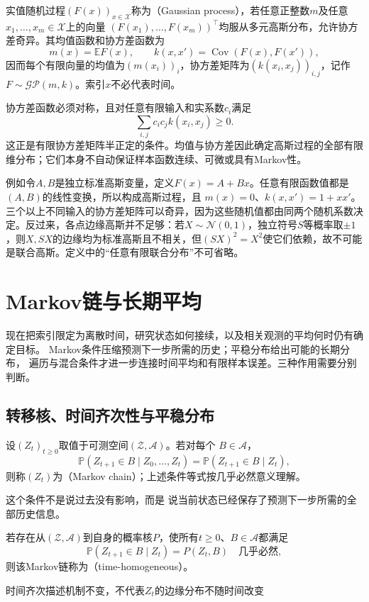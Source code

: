 \begin{definition}[高斯过程]
  \label{def:stoch-gaussian-process}
  实值随机过程\((F(x))_{x\in\mathcal X}\)称为（Gaussian process），若任意正整数\(m\)及任意\(x_1,\ldots,x_m\in\mathcal X\)上的向量
  \((F(x_1),\ldots,F(x_m))^\top\)均服从多元高斯分布，允许协方差奇异。其均值函数和协方差函数为
  \[
    m(x)=\mathbb E F(x),\qquad
    k(x,x')=\operatorname{Cov}(F(x),F(x')),
  \]
  因而每个有限向量的均值为\((m(x_i))_i\)，协方差矩阵为\((k(x_i,x_j))_{i,j}\)，记作\(F\sim\mathcal{GP}(m,k)\)。索引\(x\)不必代表时间。
\end{definition}
协方差函数必须对称，且对任意有限输入和实系数\(c_i\)满足
\[
  \sum_{i,j}c_ic_jk(x_i,x_j)\geq0.
\]
这正是有限协方差矩阵半正定的条件。均值与协方差因此确定高斯过程的全部有限维分布；它们本身不自动保证样本函数连续、可微或具有Markov性。

例如令\(A,B\)是独立标准高斯变量，定义\(F(x)=A+Bx\)。任意有限函数值都是\((A,B)\)的线性变换，所以构成高斯过程，且
\(m(x)=0\)、\(k(x,x')=1+xx'\)。三个以上不同输入的协方差矩阵可以奇异，因为这些随机值都由同两个随机系数决定。反过来，各点边缘高斯并不足够：若\(X\sim\mathcal N(0,1)\)，独立符号\(S\)等概率取\(\pm1\)，则\(X,SX\)的边缘均为标准高斯且不相关，但\((SX)^2=X^2\)使它们依赖，故不可能是联合高斯。定义中的“任意有限联合分布”不可省略。

\section{Markov链与长期平均}
\label{sec:stoch-markov-long-run-average}

现在把索引限定为离散时间，研究状态如何接续，以及相关观测的平均何时仍有确定目标。
Markov条件压缩预测下一步所需的历史；平稳分布给出可能的长期分布，
遍历与混合条件才进一步连接时间平均和有限样本误差。三种作用需要分别判断。

\subsection{转移核、时间齐次性与平稳分布}

\begin{definition}[Markov链]
  \label{def:stoch-markov-chain}
设$(Z_t)_{t\geq0}$取值于可测空间$(\mathcal{Z},\mathcal{A})$。若对每个
$B\in\mathcal{A}$，
\[
  \mathbb{P}(Z_{t+1}\in B\mid Z_0,\ldots,Z_t)
  =
  \mathbb{P}(Z_{t+1}\in B\mid Z_t),
\]
则称$(Z_t)$为（Markov chain）；上述条件等式按几乎必然意义理解。
\end{definition}
这个条件不是说过去没有影响，而是
说当前状态已经保存了预测下一步所需的全部历史信息。
\begin{definition}[时间齐次Markov链]
  \label{def:stoch-time-homogeneous-chain}
  若存在从\((\mathcal Z,\mathcal A)\)到自身的概率核\(P\)，使所有\(t\geq0\)、\(B\in\mathcal A\)都满足
  \[ \mathbb P(Z_{t+1}\in B\mid Z_t)=P(Z_t,B)\quad\text{几乎必然}, \]
  则该Markov链称为（time-homogeneous）。
\end{definition}
时间齐次描述机制不变，不代表$Z_t$的边缘分布不随时间改变

